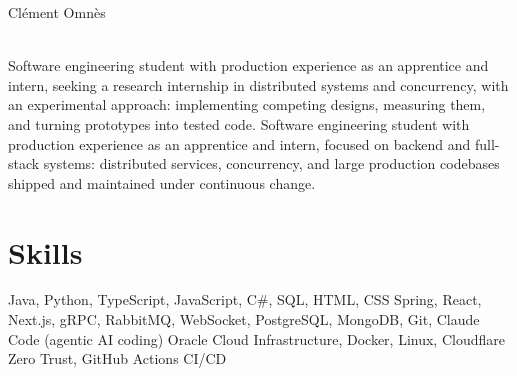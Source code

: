 \documentclass[a4paper,9pt]{article}
\begin{document}
\begin{center}
    {\Huge\textcolor{colorName}{Clément Omnès}} \\[0.5em]
    {\color{colorHeader}%
        \hspace{1.2em}%
        \hspace{1.2em}%
        \hspace{1.2em}%
        \\[2pt]%
        \hspace{1.2em}%
        \hspace{1.2em}%
        \hspace{1.2em}%
    }
\end{center}

\ifdefined\researchVariant
{\small\textcolor{colorBio}{Software engineering student with production experience as an apprentice and intern, seeking a research internship in distributed systems and concurrency, with an experimental approach: implementing competing designs, measuring them, and turning prototypes into tested code.}}
\else
{\small\textcolor{colorBio}{Software engineering student with production experience as an apprentice and intern, focused on backend and full-stack systems: distributed services, concurrency, and large production codebases shipped and maintained under continuous change.}}
\fi


\section{Skills}

\resumeDescListStart
        {Java, Python, TypeScript, JavaScript, C\#, SQL, HTML, CSS}
        {Spring, React, Next.js, gRPC, RabbitMQ, WebSocket, PostgreSQL, MongoDB, Git, Claude Code (agentic AI coding)}
        {Oracle Cloud Infrastructure, Docker, Linux, Cloudflare Zero Trust, GitHub Actions CI/CD}
\resumeDescListEnd
\end{document}

